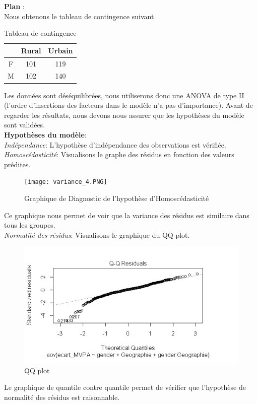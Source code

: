 \documentclass[12pt,a4paper]{article}
\begin{document}
	\textbf{Plan} : \\
	Nous obtenons le tableau de contingence suivant
	\begin{table}[H]
		\centering
		\begin{tabular}{ccc}
			\toprule
			& Rural & Urbain \\
			\midrule
			F & 101 & 119 \\
			M & 102 & 140 \\
			\bottomrule
		\end{tabular}
		\caption{Tableau de contingence}
		\label{tab:tab_contingence}
	\end{table}
	Les données sont déséquilibrées, nous utiliserons donc une ANOVA de type II (l'ordre d'insertions des facteurs dans le modèle n'a pas d'importance). Avant de regarder les résultats, nous devons nous assurer que les hypothèses du modèle sont validées.\\
	\textbf{Hypothèses du modèle}:\\
	\textit{Indépendance}: L'hypothèse d'indépendance des observations est vérifiée.\\
	\textit{Homoscédasticité}: Visualisons le graphe des résidus en fonction des valeurs prédites.
	\begin{figure}[H]
		\centering
		\texttt{[image: variance\_4.PNG]}
		\caption{Graphique de Diagnostic de l'hypothèse d'Homoscédasticité}
		\label{fig:variance2}
	\end{figure}
	Ce graphique nous permet de voir que la variance des résidus est similaire dans tous les groupes.\\
	\textit{Normalité des résidus}: Visualisons le graphique du QQ-plot.
	\begin{figure}[H]
		\centering
		\includegraphics[width=\linewidth]{Normalité_4.PNG}
		\caption{QQ plot}
		\label{fig:qq_plot2}
	\end{figure}
	Le graphique de quantile contre quantile permet de vérifier que l'hypothèse de normalité des résidus est raisonnable.\\
	
\end{document}
